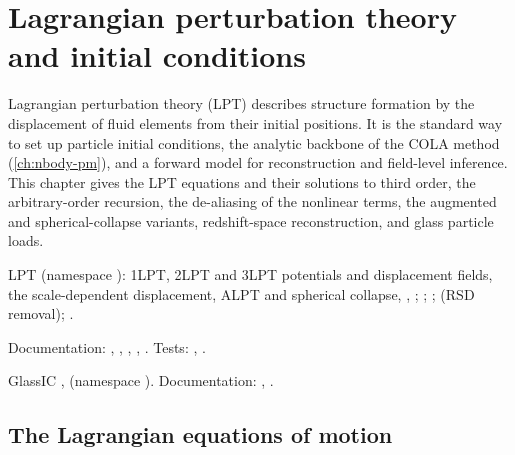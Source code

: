 \chapter{Lagrangian perturbation theory and initial conditions}\label{ch:lpt}

Lagrangian perturbation theory (LPT) describes structure formation by the displacement of fluid elements from their
initial positions. It is the standard way to set up particle initial conditions, the analytic backbone of the COLA
method (\cref{ch:nbody-pm}), and a forward model for reconstruction and field-level inference. This chapter gives the
LPT equations and their solutions to third order, the arbitrary-order recursion, the de-aliasing of the nonlinear
terms, the augmented and spherical-collapse variants, redshift-space reconstruction, and glass particle loads.

\begin{modulebox}{LPT}
 (namespace ): 1LPT, 2LPT and 3LPT potentials and displacement
fields, the scale-dependent displacement, ALPT and spherical collapse, ,
; ; ;  (RSD removal);
.\par
Documentation: , , ,
, . Tests: , .
\end{modulebox}
\begin{modulebox}{GlassIC}
,  (namespace ). Documentation:
, .
\end{modulebox}

\section{The Lagrangian equations of motion}\label{sec:lpt-equations}

